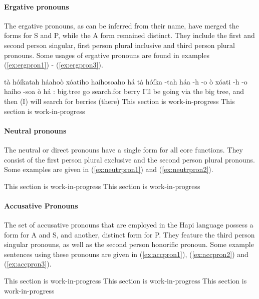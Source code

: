 \documentclass[a4paper, 12pt, oneside]{memoir}
\begin{document}
\paragraph{Ergative pronouns}
The ergative pronouns, as can be inferred from their name, have merged the forms for S and P, while the A form remained distinct. They include the first and second person singular, first person plural inclusive and third person plural pronouns. Some usages of ergative pronouns are found in examples (\ref{ex:ergpron1}) - (\ref{ex:ergpron3}).
\begin{examples}
\newbaarucmd{\cl}{\baarujuncture{\texttt{==}}}
\ex \label{ex:ergpron1}
\words tà hóíkatah háahoò xóatiho haíhosoaho há
\bits tà hóíka -tah háa -h -o \cl ò xóati -h -o haího -soa \cl ò há 
\gloss {\Fs}:{\Subject} big.tree {\Prl} go {\Ff} {\Fut} {\Seq} search.for {\Ff} {\Fut} berry {\Pl} {\Seq} {\Cngr}
\tr I'll be going via the big tree, and then (I) will search for berries (there)
\ex \label{ex:ergpron2}
This section is work-in-progress
\ex \label{ex:ergpron3}
This section is work-in-progress
\end{examples}
\paragraph{Neutral pronouns}
The neutral or direct pronouns have a single form for all core functions. They consist of the first person plural exclusive and the second person plural pronouns. Some examples are given in (\ref{ex:neutrpron1}) and (\ref{ex:neutrpron2}).
\begin{examples}
\ex \label{ex:neutrpron1}
This section is work-in-progress
\ex \label{ex:neutrpron2}
This section is work-in-progress
\end{examples}
\paragraph{Accusative Pronouns}
The set of accusative pronouns that are employed in the Hapi language possess a form for A and S, and another, distinct form for P. They feature the third person singular pronouns, as well as the second person honorific pronoun. Some example sentences using these pronouns are given in (\ref{ex:accpron1}), (\ref{ex:accpron2}) and (\ref{ex:accpron3}).
\begin{examples}
\ex \label{ex:accpron1}
This section is work-in-progress
\ex \label{ex:accpron2}
This section is work-in-progress
\ex \label{ex:accpron3}
This section is work-in-progress
\end{examples}
\end{document}
